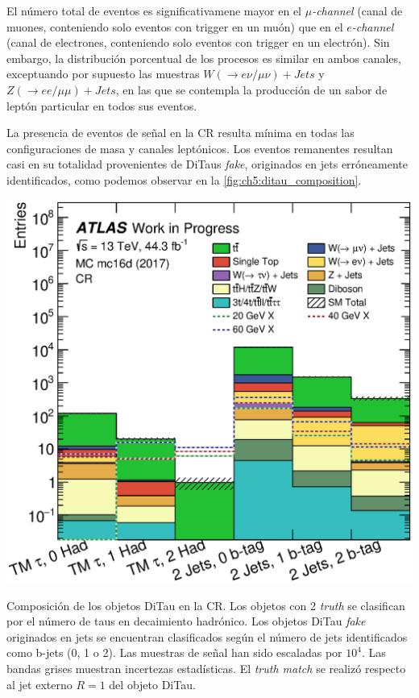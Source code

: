 El número total de eventos es significativamene mayor en el \textit{$\mu$-channel} (canal de muones, conteniendo solo eventos con trigger en un muón) que en el \textit{$e$-channel} (canal de electrones, conteniendo solo eventos con trigger en un electrón). Sin embargo, la distribución porcentual de los procesos es similar en ambos canales, exceptuando por supuesto las muestras $W(\to e\nu/\mu\nu) + Jets$ y $Z(\to ee/\mu\mu) + Jets$, en las que se contempla la producción de un sabor de leptón particular en todos sus eventos.

La presencia de eventos de señal en la CR resulta mínima en todas las configuraciones de masa y canales leptónicos. Los eventos remanentes resultan casi en su totalidad provenientes de DiTaus \textit{fake}, originados en jets erróneamente identificados, como podemos observar en la \cref{fig:ch5:ditau_composition}.

\begin{marginfigure}
    \includegraphics[width=\linewidth]{Assets/Plots/h_stack_mc16d_ditau_composition.eps}
    \caption{Composición de los objetos DiTau en la CR. Los objetos con 2 \ttaus \textit{truth} se clasifican por el número de taus en decaimiento hadrónico. Los objetos DiTau \textit{fake} originados en jets se encuentran clasificados según el número de jets identificados como b-jets (0, 1 o 2). Las muestras de señal han sido escaladas por $10^4$. Las bandas grises muestran incertezas estadísticas. El \textit{truth match} se realizó respecto al jet externo $R = 1$ del objeto DiTau.}
    \label{fig:ch5:ditau_composition}
\end{marginfigure}


